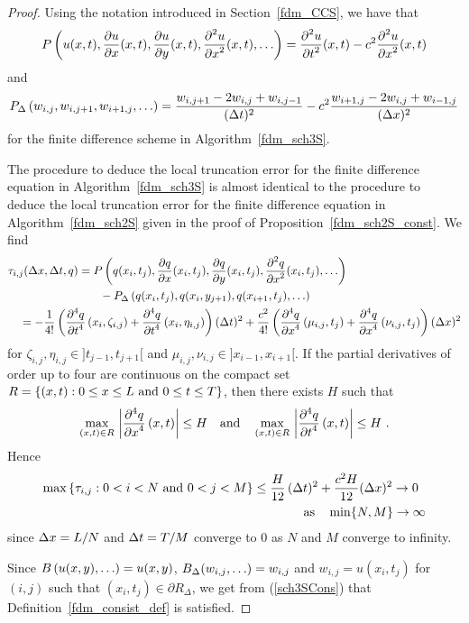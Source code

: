 \begin{proof}
Using the notation introduced in Section~\ref{fdm_CCS}, we have that
\[
P\left(u(x,t), \frac{\partial{u}}{\partial{x}}(x,t), \frac{\partial{u}}{\partial{y}}(x,t),
  \frac{\displaystyle \partial^{2}{u}} {\displaystyle \partial{x}^{2}}(x,t), \ldots \right)
= \frac{\displaystyle \partial^{2}{u}} {\displaystyle \partial{t}^{2}}(x,t) - c^2 \frac{\displaystyle \partial^{2}{u}} {\displaystyle \partial{x}^{2}}(x,t)
\]
and
\[
P_\Delta\left(w_{i,j}, w_{i,j+1}, w_{i+1,j}, \ldots\right)
= \frac{w_{i,j+1} - 2w_{i,j} + w_{i,j-1}}{(\Delta{t})^2}
- c^2 \frac{w_{i+1,j} - 2w_{i,j} + w_{i-1,j}}{(\Delta{x})^2}
\]
for the finite difference scheme in Algorithm~\ref{fdm_sch3S}.

The procedure to deduce the local truncation error for the finite
difference equation in Algorithm~\ref{fdm_sch3S} is almost identical to
the procedure to deduce the local truncation error for the finite
difference equation in Algorithm~\ref{fdm_sch2S} given in the proof of
Proposition~\ref{fdm_sch2S_const}.  We find
\begin{align*}
&\tau_{i,j}(\Delta{x},\Delta{t},q) = 
P\left(q(x_i,t_j), \frac{\partial{q}}{\partial{x}}(x_i,t_j), \frac{\partial{q}}{\partial{y}}(x_i,t_j),
  \frac{\displaystyle \partial^{2}{q}} {\displaystyle \partial{x}^{2}}(x_i,t_j), \ldots \right) \\
&\qquad\qquad\qquad\qquad
- P_\Delta\left(q(x_i,t_j), q(x_i,y_{j+1}), q(x_{i+1},t_j), \ldots\right) \\
& \quad
= - \frac{1}{4!} \left( \frac{\displaystyle \partial^{4}{q}} {\displaystyle \partial{t}^{4}}\left(x_i,\zeta_{i,j} \right)
+ \frac{\displaystyle \partial^{4}{q}} {\displaystyle \partial{t}^{4}}\left(x_i,\eta_{i,j} \right) \right) (\Delta{t})^2
+ \frac{c^2}{4!} \left( \frac{\displaystyle \partial^{4}{q}} {\displaystyle \partial{x}^{4}}\left(\mu_{i,j},t_j\right)
+ \frac{\displaystyle \partial^{4}{q}} {\displaystyle \partial{x}^{4}}\left(\nu_{i,j},t_j\right) \right) (\Delta{x})^2
\end{align*}
for $\zeta_{i,j} , \eta_{i,j} \in ]t_{j-1},t_{j+1}[$ and
$\mu_{i,j} ,\nu_{i,j} \in ]x_{i-1},x_{i+1}[$.
If the partial derivatives of order up to four are continuous on the
compact set
$\displaystyle R = \left\{ (x,t) : 0 \leq x \leq L \ \text{and} \ 0 \leq
t \leq T \right\}$, then there exists $H$
such that
\[
\max_{(x,t)\in R}\, \left|\frac{\displaystyle \partial^{4}{q}} {\displaystyle \partial{x}^{4}}\left(x,t\right) \right| \leq
H \quad \text{and} \quad 
\max_{(x,t)\in R}\, \left|\frac{\displaystyle \partial^{4}{q}} {\displaystyle \partial{t}^{4}}\left(x,t\right) \right| \leq
H \ .
\]
Hence
\begin{equation} \label{sch3SCons}
\begin{split}
\max \left\{ \tau_{i,j} : 0<i<N \ \text{and} \ 0<j < M \right\}
& \leq \frac{H}{12}\,(\Delta{t})^2 + \frac{c^2 H}{12} (\Delta{x})^2 \rightarrow 0 \\
&\qquad\qquad \text{as} \quad \min \{N, M\} \rightarrow \infty
\end{split}
\end{equation}
since $\Delta{x} = L/N$ and $\Delta{t} = T/M$ converge to $0$ as $N$ and
$M$ converge to infinity.

Since $\displaystyle B\left(u(x,y), \ldots \right) = u(x,y)$,
$\displaystyle B_\Delta(w_{i,j},\ldots) = w_{i,j}$ and $w_{i,j} = u(x_i,t_j)$
for $(i,j)$ such that $(x_i,t_j) \in \partial R_\Delta$, we get from 
(\ref{sch3SCons}) that Definition~\ref{fdm_consist_def} is satisfied.
\end{proof}

